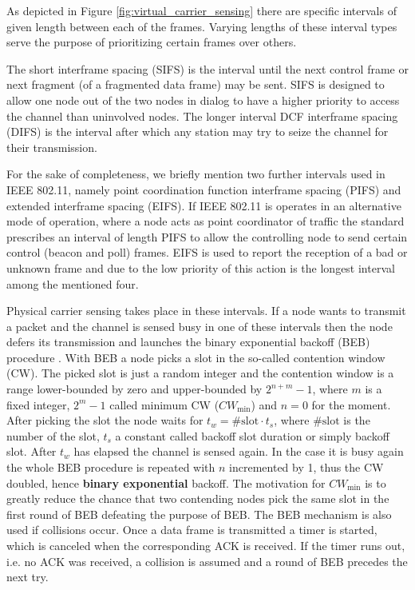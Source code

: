 As depicted in Figure \ref{fig:virtual_carrier_sensing} there are specific intervals of given length between each of the frames. Varying lengths of these interval types serve the purpose of prioritizing certain frames over others.

The short interframe spacing (SIFS) is the interval until the next control frame or next fragment (of a fragmented data frame) may be sent. SIFS is designed to allow one node out of the two nodes in dialog to have a higher priority to access the channel than uninvolved nodes. The longer interval DCF interframe spacing (DIFS) is the interval after which any station may try to seize the channel for their transmission.

For the sake of completeness, we briefly mention two further intervals used in IEEE 802.11, namely point coordination function interframe spacing (PIFS) and extended interframe spacing (EIFS). If IEEE 802.11 is operates in an alternative mode of operation, where a node acts as point coordinator of traffic the standard prescribes an interval of length PIFS to allow the controlling node to send certain control (beacon and poll) frames. EIFS is used to report the reception of a bad or unknown frame and due to the low priority of this action is the longest interval among the mentioned four. 

Physical carrier sensing takes place in these intervals. If a node wants to transmit a packet and the channel is sensed busy in one of these intervals then the node defers its transmission and launches the binary exponential backoff (BEB) procedure \cite{Gast05}. With BEB a node picks a slot in the so-called contention window (CW). The picked slot is just a random integer and the contention window is a range lower-bounded by zero and upper-bounded by $2^{n+m}-1$, where $m$ is a fixed integer, $2^m-1$ called minimum CW ($CW_\text{min}$) and $n=0$ for the moment. After picking the slot the node waits for $t_w = \text{\#slot} \cdot t_s$, where $\text{\#slot}$ is the number of the slot, $t_s$ a constant called backoff slot duration or simply backoff slot. After $t_w$ has elapsed the channel is sensed again. In the case it is busy again the whole BEB procedure is repeated with $n$ incremented by 1, thus the CW doubled, hence \textbf{binary exponential} backoff.  The motivation for $CW_\text{min}$ is to greatly reduce the chance that two contending nodes pick the same slot in the first round of BEB defeating the purpose of BEB. The BEB mechanism is also used if collisions occur. Once a data frame is transmitted a timer is started, which is canceled when the corresponding ACK is received. If the timer runs out, i.e. no ACK was received, a collision is assumed and a round of BEB precedes the next try.    

